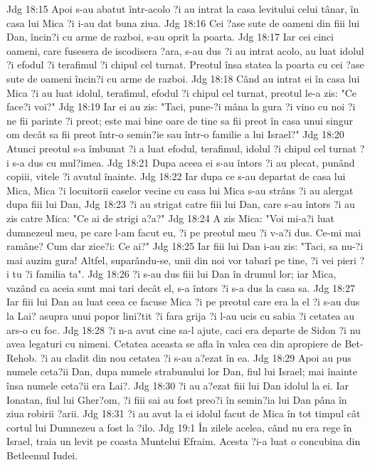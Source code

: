 Jdg 18:15  Apoi s-au abatut într-acolo ?i au intrat la casa levitului celui tânar, în casa lui Mica ?i i-au dat buna ziua.
Jdg 18:16  Cei ?ase sute de oameni din fiii lui Dan, încin?i cu arme de razboi, s-au oprit la poarta.
Jdg 18:17  Iar cei cinci oameni, care fusesera de iscodisera ?ara, s-au dus ?i au intrat acolo, au luat idolul ?i efodul ?i terafimul ?i chipul cel turnat. Preotul însa statea la poarta cu cei ?ase sute de oameni încin?i cu arme de razboi.
Jdg 18:18  Când au intrat ei în casa lui Mica ?i au luat idolul, terafimul, efodul ?i chipul cel turnat, preotul le-a zis: "Ce face?i voi?"
Jdg 18:19  Iar ei au zis: "Taci, pune-?i mâna la gura ?i vino cu noi ?i ne fii parinte ?i preot; este mai bine oare de tine sa fii preot în casa unui singur om decât sa fii preot într-o semin?ie sau într-o familie a lui Israel?"
Jdg 18:20  Atunci preotul s-a îmbunat ?i a luat efodul, terafimul, idolul ?i chipul cel turnat ?i s-a dus cu mul?imea.
Jdg 18:21  Dupa aceea ei s-au întors ?i au plecat, punând copiii, vitele ?i avutul înainte.
Jdg 18:22  Iar dupa ce s-au departat de casa lui Mica, Mica ?i locuitorii caselor vecine cu casa lui Mica s-au strâns ?i au alergat dupa fiii lui Dan,
Jdg 18:23  ?i au strigat catre fiii lui Dan, care s-au întors ?i au zis catre Mica: "Ce ai de strigi a?a?"
Jdg 18:24  A zis Mica: "Voi mi-a?i luat dumnezeul meu, pe care l-am facut eu, ?i pe preotul meu ?i v-a?i dus. Ce-mi mai ramâne? Cum dar zice?i: Ce ai?"
Jdg 18:25  Iar fiii lui Dan i-au zis: "Taci, sa nu-?i mai auzim gura! Altfel, suparându-se, unii din noi vor tabarî pe tine, ?i vei pieri ?i tu ?i familia ta".
Jdg 18:26  ?i s-au dus fiii lui Dan în drumul lor; iar Mica, vazând ca aceia sunt mai tari decât el, s-a întors ?i s-a dus la casa sa.
Jdg 18:27  Iar fiii lui Dan au luat ceea ce facuse Mica ?i pe preotul care era la el ?i s-au dus la Lai? asupra unui popor lini?tit ?i fara grija ?i l-au ucis cu sabia ?i cetatea au ars-o cu foc.
Jdg 18:28  ?i n-a avut cine sa-l ajute, caci era departe de Sidon ?i nu avea legaturi cu nimeni. Cetatea aceasta se afla în valea cea din apropiere de Bet-Rehob. ?i au cladit din nou cetatea ?i s-au a?ezat în ea.
Jdg 18:29  Apoi au pus numele ceta?ii Dan, dupa numele strabunului lor Dan, fiul lui Israel; mai înainte însa numele ceta?ii era Lai?.
Jdg 18:30  ?i au a?ezat fiii lui Dan idolul la ei. Iar Ionatan, fiul lui Gher?om, ?i fiii sai au fost preo?i în semin?ia lui Dan pâna în ziua robirii ?arii.
Jdg 18:31  ?i au avut la ei idolul facut de Mica în tot timpul cât cortul lui Dumnezeu a fost la ?ilo.
Jdg 19:1  În zilele acelea, când nu era rege în Israel, traia un levit pe coasta Muntelui Efraim. Acesta ?i-a luat o concubina din Betleemul Iudei.
